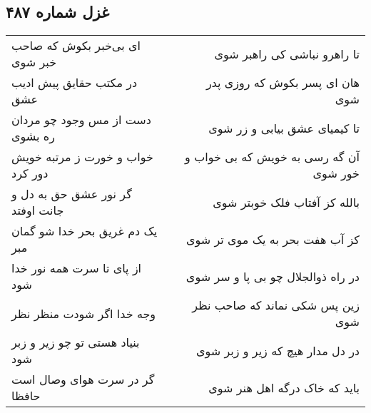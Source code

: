 \begin{center}
\section*{غزل شماره ۴۸۷}
\label{sec:sh487}
\begin{longtable}{l p{0.5cm} r}
ای بی‌خبر بکوش که صاحب خبر شوی
&&
تا راهرو نباشی کی راهبر شوی
\\
در مکتب حقایق پیش ادیب عشق
&&
هان ای پسر بکوش که روزی پدر شوی
\\
دست از مس وجود چو مردان ره بشوی
&&
تا کیمیای عشق بیابی و زر شوی
\\
خواب و خورت ز مرتبه خویش دور کرد
&&
آن گه رسی به خویش که بی خواب و خور شوی
\\
گر نور عشق حق به دل و جانت اوفتد
&&
بالله کز آفتاب فلک خوبتر شوی
\\
یک دم غریق بحر خدا شو گمان مبر
&&
کز آب هفت بحر به یک موی تر شوی
\\
از پای تا سرت همه نور خدا شود
&&
در راه ذوالجلال چو بی پا و سر شوی
\\
وجه خدا اگر شودت منظر نظر
&&
زین پس شکی نماند که صاحب نظر شوی
\\
بنیاد هستی تو چو زیر و زبر شود
&&
در دل مدار هیچ که زیر و زبر شوی
\\
گر در سرت هوای وصال است حافظا
&&
باید که خاک درگه اهل هنر شوی
\\
\end{longtable}
\end{center}
